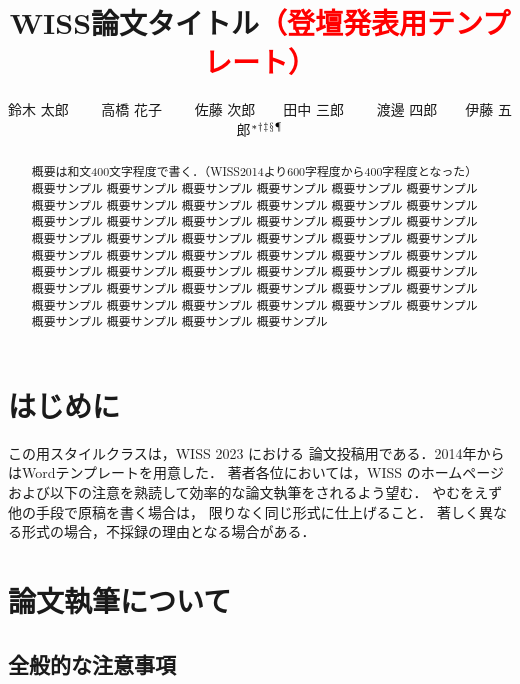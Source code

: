 \documentclass[twoside]{wiss}
\begin{document}
\title{WISS論文タイトル\textcolor{red}{（登壇発表用テンプレート）}}
\etitle{}%
%
%
%
\author{鈴木 太郎 　　高橋 花子
　　佐藤 次郎　　田中 三郎
　　渡邊 四郎　　伊藤 五郎${}^* {}^\dag {}^\ddag {}^\mathsection
{}^\mathparagraph$}

\begin{abstract}
概要は和文400文字程度で書く．（WISS2014より600字程度から400字程度となった）
概要サンプル 概要サンプル 概要サンプル 概要サンプル 概要サンプル 概要サンプル
概要サンプル 概要サンプル 概要サンプル 概要サンプル 概要サンプル 概要サンプル
概要サンプル 概要サンプル 概要サンプル 概要サンプル 概要サンプル 概要サンプル
概要サンプル 概要サンプル 概要サンプル 概要サンプル 概要サンプル 概要サンプル
概要サンプル 概要サンプル 概要サンプル 概要サンプル 概要サンプル 概要サンプル
概要サンプル 概要サンプル 概要サンプル 概要サンプル 概要サンプル 概要サンプル
概要サンプル 概要サンプル 概要サンプル 概要サンプル 概要サンプル 概要サンプル
概要サンプル 概要サンプル 概要サンプル 概要サンプル 概要サンプル 概要サンプル
概要サンプル 概要サンプル 概要サンプル 概要サンプル
\end{abstract}

\maketitle

\section{はじめに}

この\LaTeXe{}用スタイルクラスは，WISS 2023 における
論文投稿用である．2014年からはWordテンプレートを用意した．
著者各位においては，WISS のホームページ\cite{wiss}
および以下の注意を熟読して効率的な論文執筆をされるよう望む．
やむをえず他の手段で原稿を書く場合は，
限りなく同じ形式に仕上げること．
著しく異なる形式の場合，不採録の理由となる場合がある．

\section{論文執筆について}

\subsection{全般的な注意事項}
\end{document}

